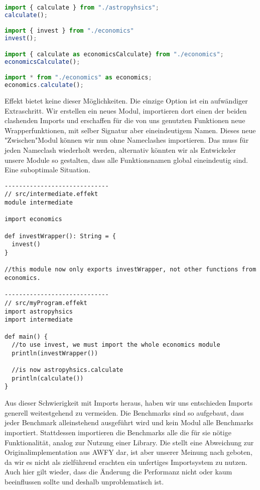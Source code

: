 \begin{lstlisting}[language=javascript]
import { calculate } from "./astropyhsics";
calculate();

import { invest } from "./economics"
invest();

import { calculate as economicsCalculate} from "./economics";
economicsCalculate();

import * from "./economics" as economics;
economics.calculate();
\end{lstlisting}

Effekt bietet keine dieser Möglichkeiten. Die einzige Option ist ein aufwändiger Extraschritt. Wir erstellen ein neues Modul, importieren dort einen der beiden clashenden Imports und erschaffen für die von uns genutzten Funktionen neue Wrapperfunktionen, mit selber Signatur aber eineindeutigem Namen.
Dieses neue "Zwischen"Modul können wir nun ohne Nameclashes importieren.
Das muss für jeden Nameclash wiederholt werden, alternativ könnten wir als Entwickeler unsere Module so gestalten, dass alle Funktionsnamen global eineindeutig sind. Eine suboptimale Situation.
\begin{lstlisting}
-----------------------------
// src/intermediate.effekt
module intermediate

import economics

def investWrapper(): String = {
  invest()
}

//this module now only exports investWrapper, not other functions from economics.

-----------------------------
// src/myProgram.effekt
import astropyhsics
import intermediate

def main() {
  //to use invest, we must import the whole economics module
  println(investWrapper())

  //is now astropyhsics.calculate
  println(calculate())
}
\end{lstlisting}

Aus dieser Schwierigkeit mit Imports heraus, haben wir uns entschieden Imports generell weitestgehend zu vermeiden.
Die Benchmarks sind so aufgebaut, dass jeder Benchmark alleinstehend ausgeführt wird und kein Modul alle Benchmarks importiert. Stattdessen importieren die Benchmarks alle die für sie nötige Funktionalität, analog zur Nutzung einer Library. Die stellt eine Abweichung zur Originalimplementation aus AWFY dar, ist aber unserer Meinung nach geboten, da wir es nicht als zielführend erachten ein unfertiges Importsystem zu nutzen. Auch hier gilt wieder, dass die Änderung die Performanz nicht oder kaum beeinflussen sollte und deshalb unproblematisch ist.

